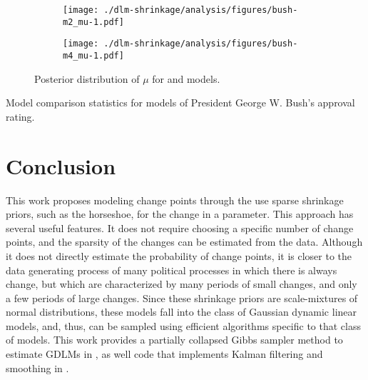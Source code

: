 \begin{figure}[thbp!]
  \begin{subfigure}[b]{\linewidth}
    \texttt{[image: ./dlm-shrinkage/analysis/figures/bush-m2\_mu-1.pdf]}
    \caption{}
  \end{subfigure}

  \begin{subfigure}[b]{\linewidth}
    \texttt{[image: ./dlm-shrinkage/analysis/figures/bush-m4\_mu-1.pdf]}
    \caption{}
  \end{subfigure}
  \caption{Posterior distribution of $\mu$ for  and  models.}
  \label{dlm:fig:bush_mu2}
\end{figure}


\begin{table}[thbp!]
  \centering
  
  \caption{Model comparison statistics for models of President George W. Bush's approval rating.}
  \label{dlm:tab:bush_model_comp}
\end{table}



\section{Conclusion}
\label{dlm:sec:conclusion}


This work proposes modeling change points through the use sparse shrinkage priors, such as the horseshoe, for the change in a parameter.
This approach has several useful features. 
It does not require choosing a specific number of change points, and the sparsity of the changes can be estimated from the data.
Although it does not directly estimate the probability of change points, it is closer to the data generating process of many political processes in which there is always change, but which are characterized by many periods of small changes, and only a few periods of large changes.
Since these shrinkage priors are scale-mixtures of normal distributions, these models fall into the class of Gaussian dynamic linear models, and, thus, can be sampled using efficient algorithms specific to that class of models.
This work provides a partially collapsed Gibbs sampler method to estimate GDLMs in \Stan{}, as well \Stan{} code that implements Kalman filtering and smoothing in \Stan{}.

